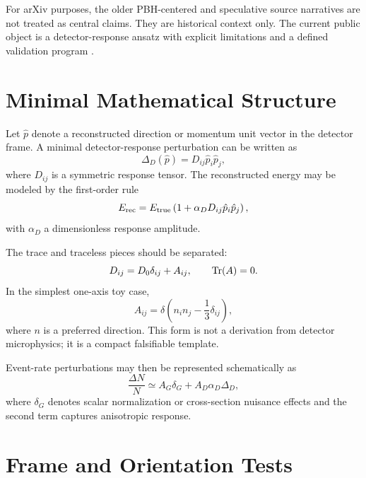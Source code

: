 \documentclass[11pt]{article}
\begin{document}
For arXiv purposes, the older PBH-centered and speculative source narratives are
not treated as central claims.  They are historical context only.  The current
public object is a detector-response ansatz with explicit limitations and a
defined validation program \cite{lsczenodo2026}.

\section{Minimal Mathematical Structure}

Let $\hat p$ denote a reconstructed direction or momentum unit vector in the
detector frame.  A minimal detector-response perturbation can be written as
\begin{equation}
  \Delta_D(\hat p) = D_{ij}\hat p_i \hat p_j,
  \label{eq:projection}
\end{equation}
where $D_{ij}$ is a symmetric response tensor.  The reconstructed energy may be
modeled by the first-order rule
\begin{equation}
  E_{\rm rec} = E_{\rm true}\left(1 + \alpha_D D_{ij}\hat p_i\hat p_j\right),
  \label{eq:energy}
\end{equation}
with $\alpha_D$ a dimensionless response amplitude.

The trace and traceless pieces should be separated:
\begin{equation}
  D_{ij} = D_0 \delta_{ij} + A_{ij}, \qquad {\rm Tr}(A)=0.
  \label{eq:decomp}
\end{equation}
In the simplest one-axis toy case,
\begin{equation}
  A_{ij} = \delta \left(n_i n_j - \frac{1}{3}\delta_{ij}\right),
  \label{eq:axis}
\end{equation}
where $n$ is a preferred direction.  This form is not a derivation from detector
microphysics; it is a compact falsifiable template.

Event-rate perturbations may then be represented schematically as
\begin{equation}
  \frac{\Delta N}{N} \simeq A_G \delta_G + A_D \alpha_D \Delta_D,
  \label{eq:rate}
\end{equation}
where $\delta_G$ denotes scalar normalization or cross-section nuisance effects
and the second term captures anisotropic response.

\section{Frame and Orientation Tests}
\end{document}

